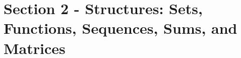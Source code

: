 \documentclass[../../Main.tex]{subfiles}
\begin{document}
\chapter{Section 2 - Structures: Sets, Functions, Sequences, Sums, and Matrices}





\setcounter{section}{5} %


\end{document}
